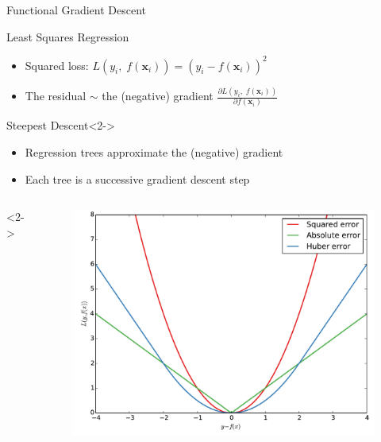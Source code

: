 \documentclass[a4paper,presentation]{beamer}
\begin{document}
\begin{frame}{Functional Gradient Descent}
    \begin{block}{Least Squares Regression}
      \begin{itemize}
        \item Squared loss: $L(y_i,\;f(\mathbf{x}_i)) = (y_i - f(\mathbf{x}_i))^2$
        \item The residual $\sim$ the (negative) gradient $\frac{\partial L(y_i,\;f(\mathbf{x}_i))}{\partial f(\mathbf{x}_i)}$
      \end{itemize}
    \end{block}

    \begin{block}{Steepest Descent}<2->
      \begin{itemize}
        \item Regression trees approximate the (negative) gradient
        \item Each tree is a successive gradient descent step
      \end{itemize}
    \end{block}
    \vspace{-0.5cm}
    \begin{columns}[c]<2->
      \begin{column}{.5\textwidth}
        \begin{figure}
          \includegraphics[scale=0.2]{./images/reg-loss-func.pdf}

\end{figure}
\end{column}
\end{columns}
\end{frame}
\end{document}
